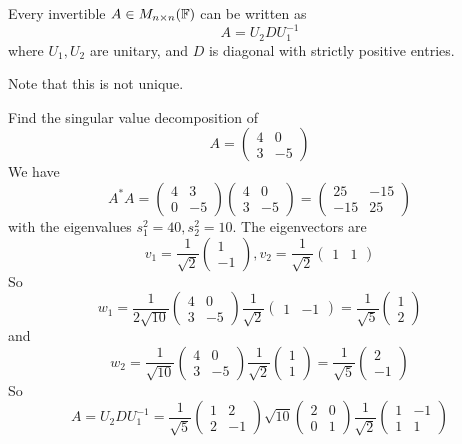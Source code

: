 \documentclass[12pt]{article}
\begin{document}
\begin{thm}
	Every invertible $A \in M_{n\times n}(\mathbb{F})$ can be written as
	$$A = U_2DU_1^{-1}$$
	where $U_1,U_2$ are unitary, and $D$ is diagonal with strictly positive entries.
\end{thm}

Note that this is not unique.

\begin{ex}
	Find the singular value decomposition of
	$$A = \begin{pmatrix} 4 & 0 \\ 3 & -5 \end{pmatrix}$$
	We have
	$$A^*A = \begin{pmatrix} 4 & 3 \\ 0 & -5 \end{pmatrix} \begin{pmatrix} 4 & 0 \\ 3 & -5 \end{pmatrix} = \begin{pmatrix} 25 & -15 \\ -15 & 25 \end{pmatrix}$$
	with the eigenvalues $s_1^2 = 40, s_2^2 = 10$. The eigenvectors are
	$$v_1 = \frac{1}{\sqrt{2}} \begin{pmatrix} 1 \\ -1 \end{pmatrix}, v_2 = \frac{1}{\sqrt{2}} \begin{pmatrix} 1 & 1 \end{pmatrix}$$
	So
	$$w_1 = \frac{1}{2\sqrt{10}} \begin{pmatrix} 4 & 0 \\ 3 & -5 \end{pmatrix} \frac{1}{\sqrt{2}} \begin{pmatrix} 1 & -1 \end{pmatrix} = \frac{1}{\sqrt{5}} \begin{pmatrix} 1 \\ 2 \end{pmatrix}$$
	and
	$$w_2 = \frac{1}{\sqrt{10}} \begin{pmatrix} 4 & 0 \\ 3 & -5 \end{pmatrix} \frac{1}{\sqrt{2}} \begin{pmatrix} 1 \\ 1 \end{pmatrix} = \frac{1}{\sqrt{5}} \begin{pmatrix} 2 \\ -1 \end{pmatrix}$$
	So
	$$A = U_2DU_1^{-1} = \frac{1}{\sqrt{5}} \begin{pmatrix} 1 & 2 \\ 2 & -1 \end{pmatrix} \sqrt{10} \begin{pmatrix} 2 & 0 \\ 0 & 1 \end{pmatrix} \frac{1}{\sqrt{2}} \begin{pmatrix} 1 & -1 \\ 1 & 1 \end{pmatrix}$$
\end{ex}
\end{document}
